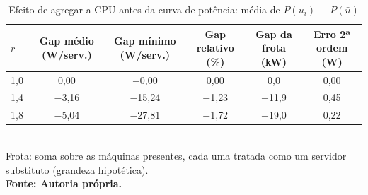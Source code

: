 \begin{table}[htb]
\caption{Efeito de agregar a CPU antes da curva de potência: média de $P(u_i)$ $-$ $P(\bar{u})$}
\label{tab:v3-jensen}
\centering
\footnotesize
\setlength{\tabcolsep}{3pt}
\renewcommand{\arraystretch}{1.15}
\begin{tabular}{|l|c|c|c|c|c|}
\hline
\textbf{$r$} & \textbf{Gap médio (W/serv.)} & \textbf{Gap mínimo (W/serv.)} & \textbf{Gap relativo (\%)} & \textbf{Gap da frota (kW)} & \textbf{Erro 2ª ordem (W)} \\
\hline
1{,}0 & 0{,}00 & $-$0{,}00 & 0{,}00 & 0{,}0 & 0{,}00 \\
1{,}4 & $-$3{,}16 & $-$15{,}24 & $-$1{,}23 & $-$11{,}9 & 0{,}45 \\
1{,}8 & $-$5{,}04 & $-$27{,}81 & $-$1{,}72 & $-$19{,}0 & 0{,}22 \\
\hline
\end{tabular}\\
\footnotesize Frota: soma sobre as máquinas presentes, cada uma tratada como um servidor substituto (grandeza hipotética).\\
\textbf{\footnotesize Fonte: Autoria própria.}
\end{table}
